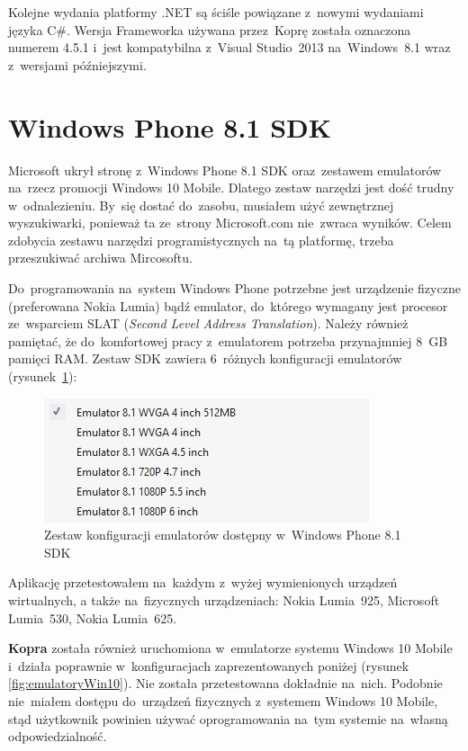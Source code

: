 \documentclass[a4paper,twoside,titlepage,openright]{book}
\begin{document}
Kolejne wydania platformy .NET są ściśle powiązane z~nowymi wydaniami języka C\#. Wersja Frameworka używana przez~Koprę została oznaczona numerem 4.5.1 i~jest kompatybilna z~Visual Studio~2013 na~Windows~8.1 wraz z~wersjami późniejszymi. 


\section{Windows Phone 8.1 SDK}
Microsoft ukrył stronę z~Windows Phone 8.1 SDK oraz~zestawem emulatorów na~rzecz promocji Windows 10 Mobile. Dlatego zestaw narzędzi jest dość trudny w~odnalezieniu. By~się dostać do~zasobu, musiałem użyć zewnętrznej wyszukiwarki, ponieważ ta ze~strony Microsoft.com nie~zwraca wyników. Celem zdobycia zestawu narzędzi programistycznych na~tą platformę, trzeba przeszukiwać archiwa Mircosoftu. \cite{tajneArchiwaMicrosoftu} 

Do~programowania na~system Windows Phone potrzebne jest urządzenie fizyczne (preferowana Nokia Lumia) bądź emulator, do~którego wymagany jest procesor ze~wsparciem SLAT (\textit{Second Level Address Translation}). Należy również pamiętać, że do~komfortowej pracy z~emulatorem potrzeba przynajmniej 8~GB pamięci RAM. Zestaw SDK zawiera 6~różnych konfiguracji emulatorów (rysunek~\ref{fig:emulatory}): 

\begin{figure}[h]
	\centering
			\includegraphics[resolution=120]{emulatory.png}
		\caption{Zestaw konfiguracji emulatorów dostępny w~Windows Phone 8.1 SDK}
		\label{fig:emulatory}
\end{figure}

Aplikację przetestowałem na~każdym z~wyżej wymienionych urządzeń wirtualnych, a także na~fizycznych urządzeniach: Nokia Lumia~925, Microsoft Lumia~530, Nokia Lumia~625.

\textbf{Kopra} została również uruchomiona w~emulatorze systemu Windows 10 Mobile i~działa poprawnie w~konfiguracjach zaprezentowanych poniżej (rysunek \ref{fig:emulatoryWin10}). Nie została przetestowana dokładnie na~nich. Podobnie nie~miałem dostępu do~urządzeń fizycznych z~systemem Windows 10 Mobile, stąd użytkownik powinien używać oprogramowania na~tym systemie na~własną odpowiedzialność.
\end{document}
